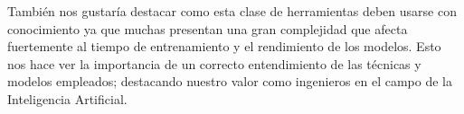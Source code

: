 \documentclass[es]{uc3mreport}
\begin{document}
\begin{report}
También nos gustaría destacar como esta clase de herramientas deben usarse con conocimiento ya que muchas presentan una gran complejidad que afecta fuertemente al tiempo de entrenamiento y el rendimiento de los modelos. Esto nos hace ver la importancia de un correcto entendimiento de las técnicas y modelos empleados; destacando nuestro valor como ingenieros en el campo de la Inteligencia Artificial.

  \end{report}


  \label{bibliography}
  \printbibliography[title={Bibliografía}]  %

\end{document}
